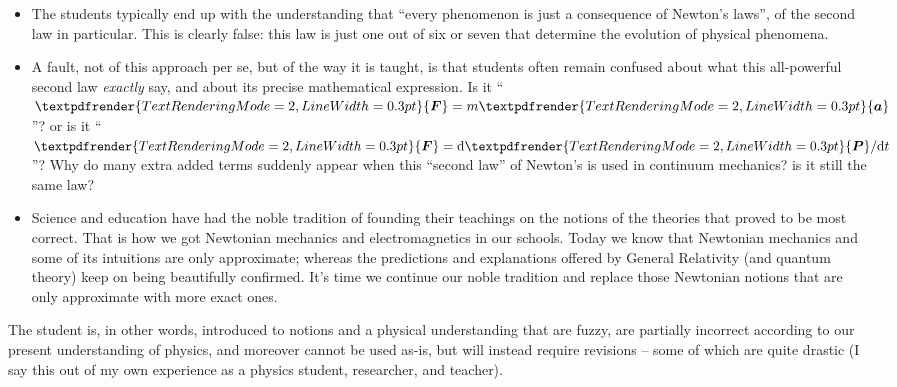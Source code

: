 \documentclass[a4paper,12pt,%
onecolumn,oneside,%
british%
]{memoir}
\renewcommand*{\bm}[1]{\textpdfrender{TextRenderingMode=2,LineWidth=0.3pt}{\boldsymbol{#1}}}
\newcommand*{\di}{\mathrm{d}}%
\renewcommand*{\|}[1][]{\nonscript\:#1\vert\nonscript\:\mathopen{}}
\begin{document}
\begin{itemize}
\item The students typically end up with the understanding that \enquote{every phenomenon is just a consequence of Newton's laws}, of the second law in particular. This is clearly false: this law is just one out of six or seven that determine the evolution of physical phenomena.

\item A fault, not of this approach per se, but of the way it is taught, is that students often remain confused about what this all-powerful second law \emph{exactly} say, and about its precise mathematical expression. Is it \enquote{$\bm{F}=m\bm{a}$}? or is it \enquote{$\bm{F}=\di\bm{P}/\di t$}? Why do many extra added terms suddenly appear when this \enquote{second law} of Newton's is used in continuum mechanics? is it still the same law?

\item Science and education have had the noble tradition of founding their teachings on the notions of the theories that proved to be most correct. That is how we got Newtonian mechanics and electromagnetics in our schools. Today we know that Newtonian mechanics and some of its intuitions are only approximate; whereas the predictions and explanations offered by General Relativity (and quantum theory) keep on being beautifully confirmed. It's time we continue our noble tradition and replace those Newtonian notions that are only approximate with more exact ones.

\end{itemize}

  The student is, in other words, introduced to notions and a physical understanding that are fuzzy, are partially incorrect according to our present understanding of physics, and moreover cannot be used as-is, but will instead require revisions -- some of which are quite drastic (I say this out of my own experience as a physics student, researcher, and teacher).
\end{document}
